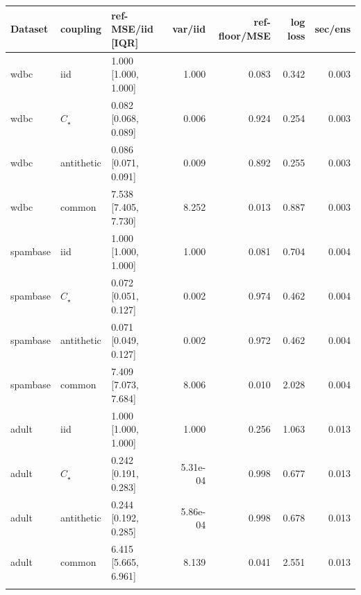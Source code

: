 \begin{tabular}{lllrrrr}
\toprule
Dataset & coupling & ref-MSE/iid [IQR] & var/iid & ref-floor/MSE & log loss & sec/ens \\
\midrule
wdbc & iid & 1.000 [1.000, 1.000] & 1.000 & 0.083 & 0.342 & 0.003 \\
wdbc & $C_\star$ & 0.082 [0.068, 0.089] & 0.006 & 0.924 & 0.254 & 0.003 \\
wdbc & antithetic & 0.086 [0.071, 0.091] & 0.009 & 0.892 & 0.255 & 0.003 \\
wdbc & common & 7.538 [7.405, 7.730] & 8.252 & 0.013 & 0.887 & 0.003 \\
\addlinespace
spambase & iid & 1.000 [1.000, 1.000] & 1.000 & 0.081 & 0.704 & 0.004 \\
spambase & $C_\star$ & 0.072 [0.051, 0.127] & 0.002 & 0.974 & 0.462 & 0.004 \\
spambase & antithetic & 0.071 [0.049, 0.127] & 0.002 & 0.972 & 0.462 & 0.004 \\
spambase & common & 7.409 [7.073, 7.684] & 8.006 & 0.010 & 2.028 & 0.004 \\
\addlinespace
adult & iid & 1.000 [1.000, 1.000] & 1.000 & 0.256 & 1.063 & 0.013 \\
adult & $C_\star$ & 0.242 [0.191, 0.283] & 5.31e-04 & 0.998 & 0.677 & 0.013 \\
adult & antithetic & 0.244 [0.192, 0.285] & 5.86e-04 & 0.998 & 0.678 & 0.013 \\
adult & common & 6.415 [5.665, 6.961] & 8.139 & 0.041 & 2.551 & 0.013 \\
\addlinespace
\bottomrule
\end{tabular}
